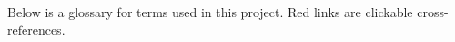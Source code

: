 \documentclass{article}
\begin{document}
Below is a glossary for terms used in this project. Red links are clickable cross-references.



\glsaddallunused
\printglossaries
\end{document}
